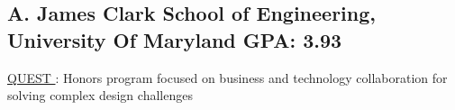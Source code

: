 \documentclass[print]{jack-resume}
\begin{document}
\subsection{A. James Clark School of Engineering, University Of Maryland \hfill GPA: 3.93}
 \hfill
\begin{tightemize}
    \item \color{darkmodePrimary}\href{https://www.rhsmith.umd.edu/programs/undergraduate-programs/academics/fellows-special-programs/quest}{QUEST \ExternalLink}: Honors program focused on business and technology collaboration for solving complex design challenges
\end{tightemize}



\end{document}
